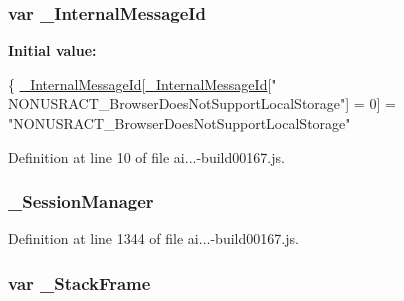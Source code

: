 \subsubsection[{\texorpdfstring{\+\_\+\+Internal\+Message\+Id}{_InternalMessageId}}]{\setlength{\rightskip}{0pt plus 5cm}var \+\_\+\+Internal\+Message\+Id}\hypertarget{_scripts_2ai_80_822_89-build00167_8js_aa4ededc59642ec3e9597dfcf82b22e85}{}\label{_scripts_2ai_80_822_89-build00167_8js_aa4ededc59642ec3e9597dfcf82b22e85}
{\bfseries Initial value\+:}
\begin{DoxyCode}
\{
            \hyperlink{obj_2_release_2_package_2_package_tmp_2_scripts_2ai_80_822_89-build00167_8js_aa4ededc59642ec3e9597dfcf82b22e85}{\_InternalMessageId}[\hyperlink{obj_2_release_2_package_2_package_tmp_2_scripts_2ai_80_822_89-build00167_8js_aa4ededc59642ec3e9597dfcf82b22e85}{\_InternalMessageId}[\textcolor{stringliteral}{"
      NONUSRACT\_BrowserDoesNotSupportLocalStorage"}] = 0] = \textcolor{stringliteral}{"NONUSRACT\_BrowserDoesNotSupportLocalStorage"}
\end{DoxyCode}


Definition at line 10 of file ai...-\/build00167.\+js.

\subsubsection[{\texorpdfstring{\+\_\+\+Session\+Manager}{_SessionManager}}]{ \+\_\+\+Session\+Manager}\hypertarget{_scripts_2ai_80_822_89-build00167_8js_ae635f688b4bd69298d993ba9db3c30b2}{}\label{_scripts_2ai_80_822_89-build00167_8js_ae635f688b4bd69298d993ba9db3c30b2}


Definition at line 1344 of file ai...-\/build00167.\+js.

\subsubsection[{\texorpdfstring{\+\_\+\+Stack\+Frame}{_StackFrame}}]{\setlength{\rightskip}{0pt plus 5cm}var \+\_\+\+Stack\+Frame}\hypertarget{_scripts_2ai_80_822_89-build00167_8js_a5929f1dacfa37e45fcd288d6a2cde2e6}{}\label{_scripts_2ai_80_822_89-build00167_8js_a5929f1dacfa37e45fcd288d6a2cde2e6}


